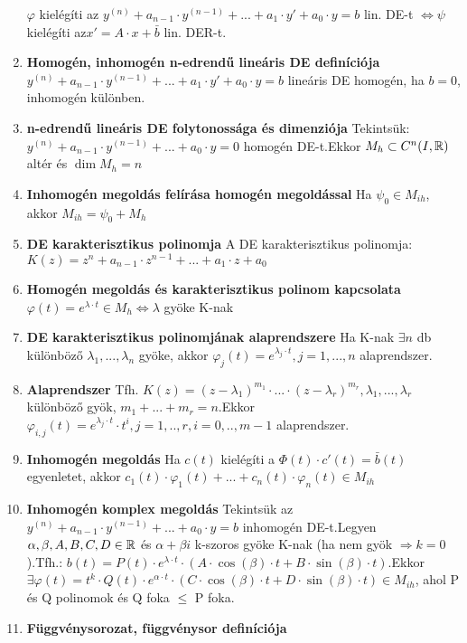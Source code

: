 \documentclass{article}
\begin{document}
\begin{enumerate}
	$\varphi$ kielégíti az $y^{(n)}+a_{n-1}\cdot y^{(n-1)}+...+a_1\cdot y'+a_0\cdot y=b$
	lin. DE-t $\Leftrightarrow\psi$ kielégíti az\br$x'=A\cdot x+\bar{b}$ lin. DER-t.
	\item\textbf{Homogén, inhomogén n-edrendű lineáris DE definíciója}\br
	$y^{(n)}+a_{n-1}\cdot y^{(n-1)}+...+a_1\cdot y'+a_0\cdot y = b$ lineáris DE
	homogén, ha $b=0$, inhomogén különben.
	\item\textbf{n-edrendű lineáris DE folytonossága és dimenziója}\br
	Tekintsük: $y^{(n)}+a_{n-1}\cdot y^{(n-1)}+...+a_0\cdot y=0$
	homogén DE-t.\br Ekkor $M_h\subset C^n (I, \mathbb{R})$ altér és $\dim M_h=n$
	\item\textbf{Inhomogén megoldás felírása homogén megoldással}\br
	Ha $\psi_0\in M_{ih}$, akkor $M_{ih}=\psi_0+M_h$
	\item\textbf{DE karakterisztikus polinomja}\br
	A DE karakterisztikus polinomja: $K(z)=z^n+a_{n-1}\cdot z^{n-1}+...+a_1
	\cdot z+a_0$
	\item\textbf{Homogén megoldás és karakterisztikus polinom kapcsolata}\br
	$\varphi(t)=e^{\lambda\cdot t}\in M_h \Leftrightarrow\lambda$ gyöke K-nak
	\item\textbf{DE karakterisztikus polinomjának alaprendszere}\br
	Ha K-nak $\exists n$ db különböző $\lambda_1, ... , \lambda_n$ gyöke, akkor
	$\varphi_{j}(t)=e^{\lambda_j\cdot t},j=1,...,n$ alaprendszer.
	\item\textbf{Alaprendszer}\br
	Tfh. $K(z)=(z-\lambda_1)^{m_1}\cdot...\cdot(z-\lambda_r)^{m_r},\lambda_1,
	... ,\lambda_r$ különböző gyök, $m_1 + ... + m_r = n$.\br Ekkor
	$\varphi_{i,j}(t)=e^{\lambda_j\cdot t}\cdot t^i,j=1,..,r,i=0,..,m-1$
	alaprendszer.
	\item\textbf{Inhomogén megoldás}\br
	Ha $c(t)$ kielégíti a $\Phi(t)\cdot c'(t) = \bar{b}(t)$ egyenletet, akkor
	$c_1(t)\cdot\varphi_1(t)+...+c_n(t)\cdot\varphi_n(t)\in M_{ih}$
	\item\textbf{Inhomogén komplex megoldás}\br
	Tekintsük az $y^{(n)}+a_{n-1}\cdot y^{(n-1)}+...+a_0\cdot y=b$ inhomogén
	DE-t.\br Legyen $\alpha,\beta,A,B,C,D\in\mathbb{R}$ és $\alpha+\beta i$ k-szoros
	gyöke K-nak (ha nem gyök $\Rightarrow k=0$).\br Tfh.: $b(t)=P(t)\cdot
	e^{\lambda\cdot t}\cdot(A\cdot \cos(\beta)\cdot t+B\cdot\sin(\beta)
	\cdot t).$\br Ekkor $\exists\varphi(t)=t^k\cdot Q(t)\cdot e^{\alpha\cdot t}
	\cdot(C\cdot\cos(\beta)\cdot t+D\cdot\sin(\beta)\cdot t)\in M_{ih}$,
	\br ahol P és Q polinomok és Q foka $\leq$ P foka.
	\newpage
	\item\textbf{Függvénysorozat, függvénysor definíciója}
	\begin{itemize}

\end{itemize}
\end{enumerate}
\end{document}
